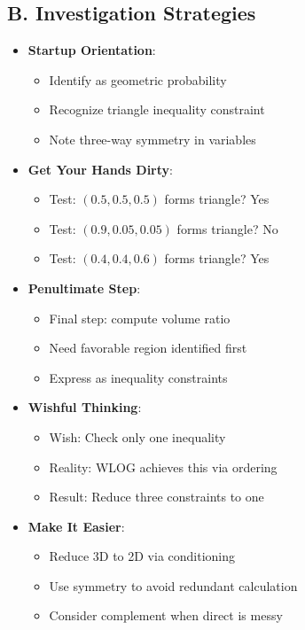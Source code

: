 \documentclass[11pt]{article}
\begin{document}
\begin{strategicbox}
\subsection*{B. Investigation Strategies}
\begin{itemize}[leftmargin=*]
    \item \textbf{Startup Orientation}: 
    \begin{itemize}
        \item Identify as geometric probability
        \item Recognize triangle inequality constraint
        \item Note three-way symmetry in variables
    \end{itemize}
    \item \textbf{Get Your Hands Dirty}: 
    \begin{itemize}
        \item Test: $(0.5, 0.5, 0.5)$ forms triangle? Yes
        \item Test: $(0.9, 0.05, 0.05)$ forms triangle? No
        \item Test: $(0.4, 0.4, 0.6)$ forms triangle? Yes
    \end{itemize}
    \item \textbf{Penultimate Step}: 
    \begin{itemize}
        \item Final step: compute volume ratio
        \item Need favorable region identified first
        \item Express as inequality constraints
    \end{itemize}
    \item \textbf{Wishful Thinking}: 
    \begin{itemize}
        \item Wish: Check only one inequality
        \item Reality: WLOG achieves this via ordering
        \item Result: Reduce three constraints to one
    \end{itemize}
    \item \textbf{Make It Easier}: 
    \begin{itemize}
        \item Reduce 3D to 2D via conditioning
        \item Use symmetry to avoid redundant calculation
        \item Consider complement when direct is messy
    \end{itemize}

\end{itemize}
\end{strategicbox}
\end{document}
